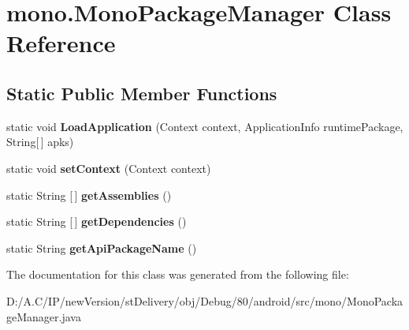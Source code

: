 \hypertarget{classmono_1_1_mono_package_manager}{}\section{mono.\+Mono\+Package\+Manager Class Reference}
\label{classmono_1_1_mono_package_manager}
\subsection*{Static Public Member Functions}
\begin{DoxyCompactItemize}
\item 
\mbox{\label{classmono_1_1_mono_package_manager_a5a2d5fc7f4891ab84e6deeae523686a2}} 
static void {\bfseries Load\+Application} (Context context, Application\+Info runtime\+Package, String\mbox{[}$\,$\mbox{]} apks)
\item 
\mbox{\label{classmono_1_1_mono_package_manager_ad3ff1f574349729b27f86da6c25c0f55}} 
static void {\bfseries set\+Context} (Context context)
\item 
\mbox{\label{classmono_1_1_mono_package_manager_a4db80b0afa9fab894e267e09bc3da334}} 
static String \mbox{[}$\,$\mbox{]} {\bfseries get\+Assemblies} ()
\item 
\mbox{\label{classmono_1_1_mono_package_manager_a708931514353feff12f2cc9d99865a9e}} 
static String \mbox{[}$\,$\mbox{]} {\bfseries get\+Dependencies} ()
\item 
\mbox{\label{classmono_1_1_mono_package_manager_a009d16dedf56862f4a23ee05e180e028}} 
static String {\bfseries get\+Api\+Package\+Name} ()
\end{DoxyCompactItemize}


The documentation for this class was generated from the following file\+:\begin{DoxyCompactItemize}
\item 
D\+:/\+A.\+C/\+I\+P/new\+Version/st\+Delivery/obj/\+Debug/80/android/src/mono/Mono\+Package\+Manager.\+java\end{DoxyCompactItemize}
